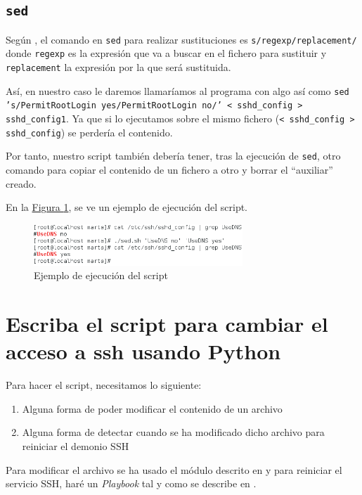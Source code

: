 \documentclass[10pt,a4paper,spanish]{article}
\numberwithin{equation}{section} %
\numberwithin{figure}{section} %
\numberwithin{table}{section} %
\begin{document}
\subsection{\texttt{sed}}
Según \cite{mansed}, el comando en \texttt{sed} para realizar sustituciones es \texttt{s/regexp/replacement/} donde \texttt{regexp} es la expresión que va a buscar en el fichero para sustituir y \texttt{replacement} la expresión por la que será sustituida.


Así, en nuestro caso le daremos llamaríamos al programa con algo así como \texttt{sed 's/PermitRootLogin yes/PermitRootLogin no/' < sshd\_config > sshd\_config1}. Ya que si lo ejecutamos sobre el mismo fichero (\texttt{< sshd\_config > sshd\_config}) se perdería el contenido. 

Por tanto, nuestro script también debería tener, tras la ejecución de \texttt{sed}, otro comando para copiar el contenido de un fichero a otro y borrar el ``auxiliar'' creado.


En la \hyperref[ejemploej]{Figura \ref*{ejemploej}}, se ve un ejemplo de ejecución del script.

\begin{figure}[!h]
\centering
\includegraphics[width=0.7\textwidth]{44}
\caption{Ejemplo de ejecución del script}
\label{ejemploej}
\end{figure}

\section{Escriba el script para cambiar el acceso a ssh usando Python}
Para hacer el script, necesitamos lo siguiente:
\begin{enumerate}[---]
    \item Alguna forma de poder modificar el contenido de un archivo
    \item Alguna forma de detectar cuando se ha modificado dicho archivo para reiniciar el demonio SSH
\end{enumerate}

Para modificar el archivo se ha usado el módulo descrito en \cite{docreplace} y para reiniciar el servicio SSH, haré un \textit{Playbook} tal y como se describe en \cite{handler}.
\end{document}
